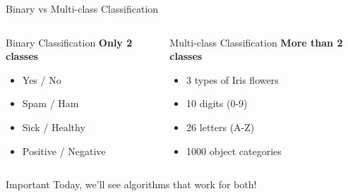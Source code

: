 \documentclass[aspectratio=169]{beamer}
\begin{document}
\begin{frame}{Binary vs Multi-class Classification}
\begin{columns}[T]
\begin{block}{Binary Classification}
\textbf{Only 2 classes}
\begin{itemize}
    \item Yes / No
    \item Spam / Ham
    \item Sick / Healthy
    \item Positive / Negative
\end{itemize}
\end{block}

\begin{block}{Multi-class Classification}
\textbf{More than 2 classes}
\begin{itemize}
    \item 3 types of Iris flowers
    \item 10 digits (0-9)
    \item 26 letters (A-Z)
    \item 1000 object categories
\end{itemize}
\end{block}
\end{columns}

\vspace{0.5cm}
\begin{alertblock}{Important}
Today, we'll see algorithms that work for both!
\end{alertblock}
\end{frame}
\end{document}
